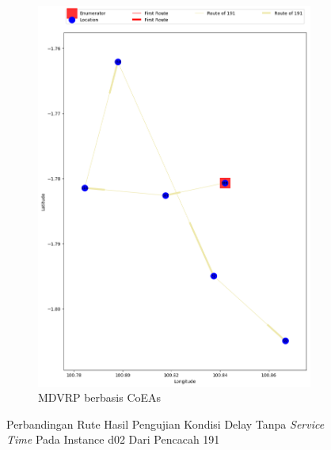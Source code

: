 \begin{figure}[H]
	\centering
	\begin{subfigure}[t]{\textwidth}
		\centering
		\includegraphics[width=\textwidth]{Resources/Images/delayed_2/real_m15_n100_delayed_2_191_coes}
		\caption{MDVRP berbasis CoEAs}
		\label{fig:real_m15_n100_delayed_2_191_coes}
	\end{subfigure}
	\caption{Perbandingan Rute Hasil Pengujian Kondisi Delay Tanpa \textit{Service Time} Pada Instance d02 Dari Pencacah 191}
	\label{fig:real_m15_n100_delayed_2_191}
\end{figure}


